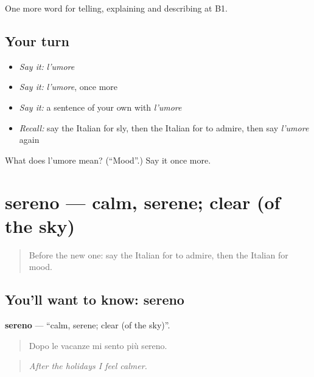 \begin{grammarlens}[title={What you've built}]
One more word for telling, explaining and describing at B1.
\end{grammarlens}

\subsection*{Your turn}
\begin{itemize}
\raggedright
  \item \emph{Say it:} \emph{l'umore}
  \item \emph{Say it:} \emph{l'umore}, once more
  \item \emph{Say it:} a sentence of your own with \emph{l'umore}
  \item \emph{Recall:} say the Italian for sly, then the Italian for to admire, then say \emph{l'umore} again
\end{itemize}

\begin{tcolorbox}[breakable,colback=teal!4,colframe=teal!35!black,title={Before you move on}]
What does l'umore mean? (\textquotedblleft{}Mood\textquotedblright{}.) Say it once more.
\end{tcolorbox}
\section[sereno]{sereno — calm, serene; clear (of the sky)}

\label{lesson:IT-C474-sereno}



\begin{quote}
Before the new one: say the Italian for to admire, then the Italian for mood.
\end{quote}

\subsection*{You'll want to know: sereno}
\textbf{sereno} — \textquotedblleft{}calm, serene; clear (of the sky)\textquotedblright{}.

\begin{quote}
Dopo le vacanze mi sento più sereno.
\end{quote}

\begin{quote}
\emph{After the holidays I feel calmer.}
\end{quote}

